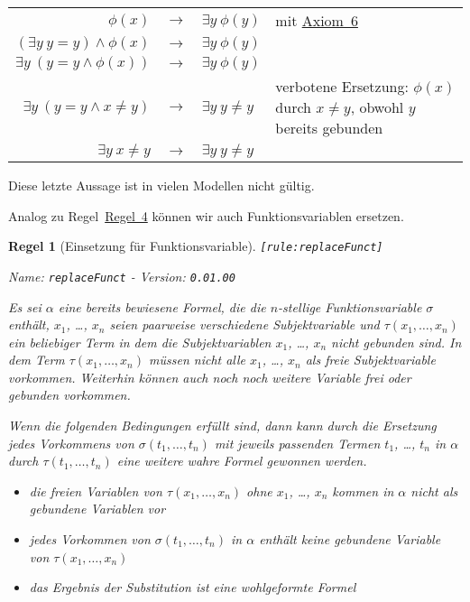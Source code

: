 \documentclass[a4paper,german,10pt,twoside]{book}
\newtheorem{rul}{Regel}
\theoremstyle{definition}
\theoremstyle{remark}
\begin{document}
\par
\begin{tabularx}{\linewidth}{rclX}
  $ \phi(x)$                             & $\rightarrow$ & $\exists y \ \phi(y)$  
    & mit \hyperlink{axiom:existencialGeneralization}{Axiom~6} \\
  $ (\exists y \ y = y) \land \phi(x)$   & $\rightarrow$ & $\exists y \ \phi(y)$  
    &  \\
  $ \exists y \ (y = y \land \phi(x))$   & $\rightarrow$ & $\exists y \ \phi(y)$  
    &  \\
  $ \exists y \ (y = y \land x \neq y)$  & $\rightarrow$ & $\exists y \ y \neq y$  
    & verbotene Ersetzung: $\phi(x)$ durch $x \neq y$, obwohl $y$ bereits gebunden \\
  $ \exists y \  x \neq y$  & $\rightarrow$ & $\exists y \ y \neq y$  
    &
\end{tabularx}

\par
Diese letzte Aussage ist in vielen Modellen nicht g{\"u}ltig.


\par
Analog zu Regel~\hyperlink{rule:replacePred}{Regel~4} k{\"o}nnen wir auch Funktionsvariablen ersetzen.

\begin{rul}[Einsetzung f{\"u}r Funktionsvariable]
\label{rule:replaceFunct} \hypertarget{rule:replaceFunct}{}
{\tt \tiny [\verb]rule:replaceFunct]]}

\par
{\em   Name: \verb]replaceFunct]  -  Version: \verb]0.01.00]}


Es sei $\alpha$ eine bereits bewiesene Formel, die die $n$-stellige Funktionsvariable $\sigma$ enth{\"a}lt, $x_1$, \ldots, $x_n$ seien paarweise verschiedene Subjektvariable und $\tau(x_1, \ldots, x_n)$ ein beliebiger Term in dem die Subjektvariablen $x_1$, \ldots, $x_n$ nicht gebunden sind. In dem Term $\tau(x_1, \ldots, x_n)$ m{\"u}ssen nicht alle $x_1$, \ldots, $x_n$ als freie Subjektvariable vorkommen. Weiterhin k{\"o}nnen auch noch  noch weitere Variable frei oder gebunden vorkommen.

Wenn die folgenden Bedingungen erf{\"u}llt sind, dann kann durch die Ersetzung jedes Vorkommens von $\sigma(t_1, \ldots, t_n)$ mit jeweils passenden Termen $t_1$, \ldots, $t_n$ in $\alpha$ durch $\tau(t_1, \ldots, t_n)$ eine weitere wahre Formel gewonnen 
werden.

\begin{itemize}

\item
die freien Variablen von $\tau(x_1, \ldots, x_n)$ ohne $x_1$, \ldots, $x_n$ kommen in $\alpha$ nicht als gebundene Variablen vor

\item
jedes Vorkommen von $\sigma(t_1, \ldots, t_n)$ in $\alpha$ enth{\"a}lt keine gebundene Variable von $\tau(x_1, \ldots, x_n)$

\item
das Ergebnis der Substitution ist eine wohlgeformte Formel

\end{itemize}
\end{rul}
\end{document}
